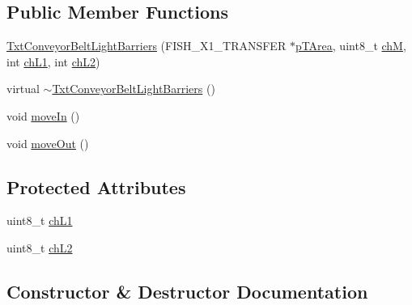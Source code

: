 \subsection*{Public Member Functions}
\begin{DoxyCompactItemize}
\item 
\hyperlink{classft_1_1_txt_conveyor_belt_light_barriers_a9427ae97ee7a54ecf60e405b800c8e70}{Txt\+Conveyor\+Belt\+Light\+Barriers} (F\+I\+S\+H\+\_\+\+X1\+\_\+\+T\+R\+A\+N\+S\+F\+ER $\ast$\hyperlink{classft_1_1_txt_conveyor_belt_aee7d4f810563d6e97a64aaa8bf0dcce0}{p\+T\+Area}, uint8\+\_\+t \hyperlink{classft_1_1_txt_conveyor_belt_a25369fe466fdbe778e9ffa25c0ae6d0f}{chM}, int \hyperlink{classft_1_1_txt_conveyor_belt_light_barriers_ae2d3931fccc38e20402a3b3aad4c1baa}{ch\+L1}, int \hyperlink{classft_1_1_txt_conveyor_belt_light_barriers_af9383c0faa8024f9b50d38dd9938a6ac}{ch\+L2})
\item 
virtual \hyperlink{classft_1_1_txt_conveyor_belt_light_barriers_aa6d6acb063ced5ef20b7901e88c13291}{$\sim$\+Txt\+Conveyor\+Belt\+Light\+Barriers} ()
\item 
void \hyperlink{classft_1_1_txt_conveyor_belt_light_barriers_af3a95dfd86db23bf00abce758e81d1ba}{move\+In} ()
\item 
void \hyperlink{classft_1_1_txt_conveyor_belt_light_barriers_ac8ba406e1508f34b496ce7115e24f314}{move\+Out} ()
\end{DoxyCompactItemize}
\subsection*{Protected Attributes}
\begin{DoxyCompactItemize}
\item 
uint8\+\_\+t \hyperlink{classft_1_1_txt_conveyor_belt_light_barriers_ae2d3931fccc38e20402a3b3aad4c1baa}{ch\+L1}
\item 
uint8\+\_\+t \hyperlink{classft_1_1_txt_conveyor_belt_light_barriers_af9383c0faa8024f9b50d38dd9938a6ac}{ch\+L2}
\end{DoxyCompactItemize}


\subsection{Constructor \& Destructor Documentation}
